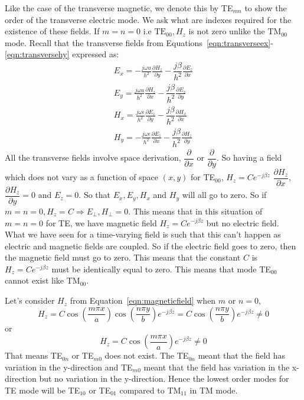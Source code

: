 Like the case of the transverse magnetic, we denote this by TE$_{mn}$ to show the order of the transverse electric mode. We ask what are indexes required for the existence of these fields. If $m = n = 0$ i.e $\text{TE}_{00},H_z$ is not zero unlike the TM$_{00}$ mode. Recall that the transverse fields from Equations~\ref{eqn:transverseex}-\ref{eqn:transversehy} expressed as:
\begin{align*}
E_x = -\frac{j\omega u}{h^2}\frac{\partial H_z}{\partial y} - \dfrac{j\beta}{h^2}\frac{\partial E_z}{\partial x}\\
E_y = \frac{j\omega u}{h^2}\frac{\partial H_z}{\partial x} - \dfrac{j\beta}{h^2}\frac{\partial E_z}{\partial y}\\
H_x = \frac{j\omega \epsilon}{h^2}\frac{\partial E_z}{\partial y} - \dfrac{j\beta}{h^2}\frac{\partial H_x}{\partial x}\\
H_y = -\frac{j\omega \epsilon}{h^2}\frac{\partial E_z}{\partial x} - \dfrac{j\beta}{h^2}\frac{\partial H_z}{\partial y}
\end{align*}
All the transverse fields involve space derivation, $\dfrac{\partial}{\partial x}$ or $\dfrac{\partial}{\partial y}$. So having a field which does not vary as a function of space $(x,y)$ for TE$_{00}$, $H_z = Ce^{-j\beta z}$  $\dfrac{\partial H_z}{\partial x}$,  $\dfrac{\partial H_z}{\partial y} = 0$ and $E_z = 0$. So that $E_x, E_y, H_x$ and $H_y$ will all go to zero. So if $m = n = 0, H_z = C \Rightarrow E_\bot , H_\bot = 0$. This means that in this situation of $m = n = 0$ for TE, we have magnetic field $H_z = Ce^{-j\beta z}$ but no electric field. What we have seen for a time-varying field is such that this can't happen as electric and magnetic fields are coupled. So if the electric field goes to zero, then the magnetic field must go to zero. This means that the constant $C$ is $H_z = Ce^{-j\beta z}$ must be identically equal to zero. This means that mode TE$_{00}$ cannot exist like TM$_{00}$.

Let's consider $H_z$ from Equation~\ref{eqn:magneticfield} when $m$ or $n = 0$,
\begin{dmath*}
H_z = C \cos \left(\frac{m\pi x}{a}\right)\cos\left(\frac{n\pi y}{b}\right)e^{-j\beta z} = C \cos \left(\frac{n\pi y}{b}\right)e^{-j\beta z} \neq 0 
\end{dmath*}
or 
\begin{dmath*}
H_z = C \cos \left(\frac{m\pi x}{a}\right)e^{-j\beta z} \neq 0 
\end{dmath*}
That means TE$_{0n}$ or TE$_{m0}$ does not exist. The TE$_{0n}$ meant that the field has variation in the y-direction and TE$_{m0}$ meant that the field has variation in the x-direction but no variation in the y-direction. Hence the lowest order modes for TE mode will be TE$_{10}$ or TE$_{01}$ compared to TM$_{11}$ in TM mode. 

